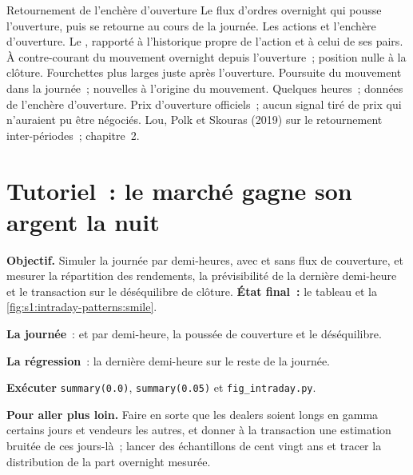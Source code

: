 \begin{strategyfile}{Retournement de l'enchère d'ouverture}\label{strat:s1:intraday-patterns:openreversal}
 Le flux d'ordres overnight qui pousse l'ouverture, puis se retourne au cours de la journée.
 Les actions et l'enchère d'ouverture.
 Le , rapporté à l'historique propre de l'action et à celui de ses pairs.
 À contre-courant du mouvement overnight depuis l'ouverture~; position nulle à la clôture.
 Fourchettes plus larges juste après l'ouverture.
 Poursuite du mouvement dans la journée~; nouvelles à l'origine du mouvement.
 Quelques heures~; données de l'enchère d'ouverture.
 Prix d'ouverture officiels~; aucun signal tiré de prix qui n'auraient pu être négociés.
 Lou, Polk et Skouras (2019) sur le retournement inter-périodes~; chapitre~2.
\end{strategyfile}

\section{Tutoriel~: le marché gagne son argent la nuit}\label{tut:s1:intraday-patterns:tut}

\begin{tutorial}
\textbf{Objectif.} Simuler la journée par demi-heures, avec et sans flux de couverture, et mesurer la répartition des rendements, la prévisibilité de la dernière demi-heure et le
transaction sur le déséquilibre de clôture. \textbf{État final~:} le tableau et la \cref{fig:s1:intraday-patterns:smile}.
\begin{tutsteps}
\item \textbf{La journée}~:  et par demi-heure, la poussée de couverture et le déséquilibre.
\label{lst:s1:intraday-patterns:day}
\item \textbf{La régression}~: la dernière demi-heure sur le reste de la journée.
\label{lst:s1:intraday-patterns:reg}
\item \textbf{Exécuter} \texttt{summary(0.0)}, \texttt{summary(0.05)} et \texttt{fig\_intraday.py}.
\end{tutsteps}
\textbf{Pour aller plus loin.} Faire en sorte que les dealers soient longs en gamma certains jours et vendeurs les autres, et donner à la transaction une estimation bruitée de ces jours-là~; lancer des échantillons de
cent vingt ans et tracer la distribution de la part overnight mesurée.
\end{tutorial}

